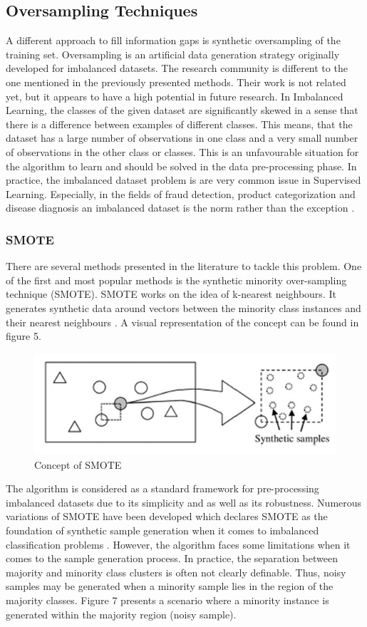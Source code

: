 \documentclass[parskip=full]{scrartcl}
\begin{document}
\subsection{Oversampling Techniques}

A different approach to fill information gaps is synthetic oversampling of the training set. Oversampling is an artificial data generation strategy originally developed for imbalanced datasets. The research community is different to the one mentioned in the previously presented methods. Their work is not related yet, but it appears to have a high potential in future research. In Imbalanced Learning, the classes of the given dataset are significantly skewed in a sense that there is a difference between examples of different classes. This means, that the dataset has a large number of observations in one class and a very small number of observations in the other class or classes. This is an unfavourable situation for the algorithm to learn and should be solved in the data pre-processing phase. In practice, the imbalanced dataset problem is are very common issue in Supervised Learning. Especially, in the fields of fraud detection, product categorization and disease diagnosis an imbalanced dataset is the norm rather than the exception \cite{He.2013}. 

\subsubsection{SMOTE}

There are several methods presented in the literature to tackle this problem. One of the first and most popular methods is the synthetic minority over-sampling technique (SMOTE). SMOTE works on the idea of k-nearest neighbours. It generates synthetic data around vectors between the minority class instances and their nearest neighbours \cite{Chawla.2002}. A visual representation of the concept can be found in figure 5.

\begin{figure}[h]
	\centering
	\includegraphics[width=0.5\linewidth]{SMOTE}
	\caption{Concept of SMOTE}
	\label{fig:smote}
\end{figure}

The algorithm is considered as a standard framework for pre-processing imbalanced datasets due to its simplicity and as well as its robustness. Numerous variations of SMOTE have been developed which declares SMOTE as the foundation of synthetic sample generation when it comes to imbalanced classification problems \cite{Fernandez.2018}. However, the algorithm faces some limitations when it comes to the sample generation process. In practice, the separation between majority and minority class clusters is often not clearly definable. Thus, noisy samples may be generated when a minority sample lies in the region of the majority classes. Figure 7 presents a scenario where a minority instance is generated within the majority region (noisy sample).
\end{document}

